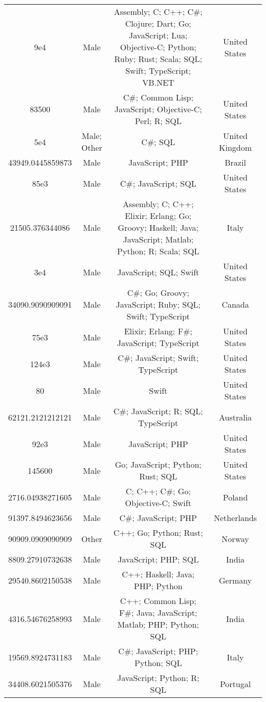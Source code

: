 \begin{center}
\begin{tabular}{ |c|c|c|c| }
9e4  &  Male  &  Assembly; C; C++; C\#; Clojure; Dart; Go; JavaScript; Lua; Objective-C; Python; Ruby; Rust; Scala; SQL; Swift; TypeScript; VB.NET  &  United States  \\ 
83500  &  Male  &  C\#; Common Lisp; JavaScript; Objective-C; Perl; R; SQL  &  United States  \\ 
5e4  &  Male; Other  &  C\#; SQL  &  United Kingdom  \\ 
43949.0445859873  &  Male  &  JavaScript; PHP  &  Brazil  \\ 
85e3  &  Male  &  C\#; JavaScript; SQL  &  United States  \\ 
21505.376344086  &  Male  &  Assembly; C; C++; Elixir; Erlang; Go; Groovy; Haskell; Java; JavaScript; Matlab; Python; R; Scala; SQL  &  Italy  \\ 
3e4  &  Male  &  JavaScript; SQL; Swift  &  United States  \\ 
34090.9090909091  &  Male  &  C\#; Go; Groovy; JavaScript; Ruby; SQL; Swift; TypeScript  &  Canada  \\ 
75e3  &  Male  &  Elixir; Erlang; F\#; JavaScript; TypeScript  &  United States  \\ 
124e3  &  Male  &  C\#; JavaScript; Swift; TypeScript  &  United States  \\ 
80  &  Male  &  Swift  &  United States  \\ 
62121.2121212121  &  Male  &  C\#; JavaScript; R; SQL; TypeScript  &  Australia  \\ 
92e3  &  Male  &  JavaScript; PHP  &  United States  \\ 
145600  &  Male  &  Go; JavaScript; Python; Rust; SQL  &  United States  \\ 
2716.04938271605  &  Male  &  C; C++; C\#; Go; Objective-C; Swift  &  Poland  \\ 
91397.8494623656  &  Male  &  C\#; JavaScript; PHP  &  Netherlands  \\ 
90909.0909090909  &  Other  &  C++; Go; Python; Rust; SQL  &  Norway  \\ 
8809.27910732638  &  Male  &  JavaScript; PHP; SQL  &  India  \\ 
29540.8602150538  &  Male  &  C++; Haskell; Java; PHP; Python  &  Germany  \\ 
4316.54676258993  &  Male  &  C++; Common Lisp; F\#; Java; JavaScript; Matlab; PHP; Python; SQL  &  India  \\ 
19569.8924731183  &  Male  &  C\#; JavaScript; PHP; Python; SQL  &  Italy  \\ 
34408.6021505376  &  Male  &  JavaScript; Python; R; SQL  &  Portugal  \\ 

\end{tabular}
\end{center}
